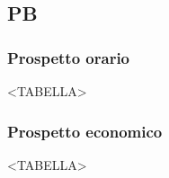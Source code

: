 \subsection{PB}

\subsubsection{Prospetto orario}

<TABELLA>

\subsubsection{Prospetto economico}

<TABELLA>

